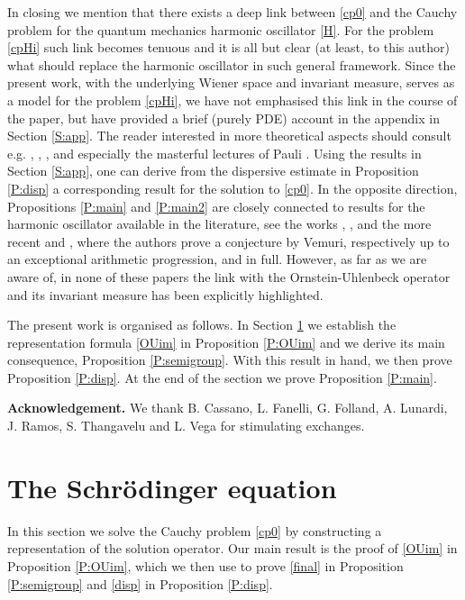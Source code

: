 \documentclass[11pt,a4paper]{amsart}
\numberwithin{equation}{section}
\numberwithin{equation}{section}
\begin{document}
In closing we mention that there exists a deep link between \eqref{cp0} and the Cauchy problem for the quantum mechanics harmonic oscillator \eqref{H}. For the  problem \eqref{cpHi} such link becomes tenuous and it is all but clear (at least, to this author) what should replace the harmonic oscillator in such general framework. Since the present work, with the underlying Wiener space and invariant measure, serves as a model for the problem \eqref{cpHi}, we have not emphasised this link in the course of the paper, but have provided a brief (purely PDE) account in the appendix in Section \ref{S:app}. The reader interested in more theoretical aspects should consult e.g. \cite{Ta1}, \cite{Ta2}, \cite{BGV}, and especially the masterful lectures of Pauli \cite{Pauli}. Using the results in Section \ref{S:app}, one can derive from the dispersive estimate in Proposition \ref{P:disp} a corresponding result for the solution to \eqref{cp0}. In the opposite direction, Propositions \ref{P:main} and \ref{P:main2} are closely connected to results for the harmonic oscillator available in the literature, see the works \cite{Vel}, \cite{CF}, and the more recent \cite{KJO} and \cite{RR}, where the authors prove a conjecture by Vemuri, respectively up to an exceptional arithmetic progression, and in full. However, as far as we are aware of, in none of these papers the link with the Ornstein-Uhlenbeck operator and its invariant measure has been explicitly highlighted. 
 
The present work is organised as follows. In Section \ref{S:senzadrift} we establish the representation formula \eqref{OUim} in Proposition \ref{P:OUim} and we derive its main consequence,  Proposition \ref{P:semigroup}. With this result in hand, we then prove Proposition \ref{P:disp}. At the end of the section we prove Proposition \ref{P:main}.



\medskip


\textbf{Acknowledgement.} We thank B. Cassano, L. Fanelli, G. Folland, A. Lunardi, J. Ramos, S. Thangavelu and L. Vega for stimulating exchanges. 

\vskip 0.2in

\section{The Schr\"odinger equation}\label{S:senzadrift}

In this section we solve the Cauchy problem \eqref{cp0} by constructing a representation of the solution operator. Our main result is the proof of \eqref{OUim} in Proposition \ref{P:OUim}, which we then use to prove \eqref{final} in Proposition \ref{P:semigroup} and \eqref{disp} in Proposition \ref{P:disp}.  
\end{document}
